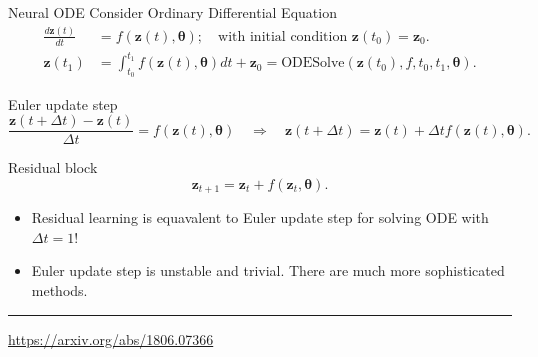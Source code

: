 \documentclass{beamer}
\newcommand{\bz}{\mathbf{z}}
\newcommand{\btheta}{\boldsymbol{\theta}}
\begin{document}
\begin{frame}{Neural ODE}
	Consider Ordinary Differential Equation    
	\begin{align*}
	    \frac{d \bz(t)}{dt} &= f(\bz(t), \btheta); \quad \text{with initial condition }\bz(t_0) = \bz_0. \\
	    \bz(t_1) &= \int^{t_1}_{t_0} f(\bz(t), \btheta) d t  + \bz_0 = \text{ODESolve}(\bz(t_0), f, t_0,t_1, \btheta).
	\end{align*}
	\vspace{-0.4cm}
	\begin{block}{Euler update step}
		\vspace{-0.4cm}
		\[
		    \frac{\bz(t + \Delta t) - \bz(t)}{\Delta t} = f(\bz(t), \btheta) \quad \Rightarrow \quad \bz(t + \Delta t) = \bz(t) + \Delta t f(\bz(t), \btheta).
		\]
		\vspace{-0.5cm}
	\end{block}
	\begin{block}{Residual block}
		\vspace{-0.5cm}
		\[
		    \bz_{t+1} = \bz_t + f(\bz_t, \btheta).
		\]
		\vspace{-0.4cm}
	\end{block}
	\begin{itemize}
	 \item Residual learning is equavalent to Euler update step for solving ODE with $\Delta t = 1$!
	 \item Euler update step is unstable and trivial. There are much more sophisticated methods.
	\end{itemize}
	 \vfill
	\hrule\medskip
	{\scriptsize \href{https://arxiv.org/abs/1806.07366}{https://arxiv.org/abs/1806.07366}}   
\end{frame}
\end{document}
